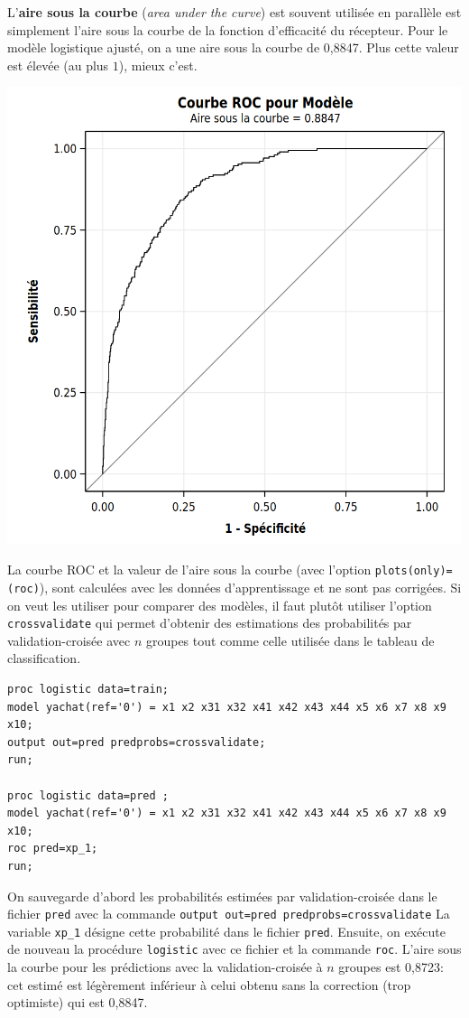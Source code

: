 \documentclass[
  11pt,
  letterpaper,
]{book}
\theoremstyle{definition}
\theoremstyle{definition}
\theoremstyle{definition}
\theoremstyle{remark}
\begin{document}
L'\textbf{aire sous la courbe} (\emph{area under the curve}) est souvent utilisée en parallèle
est simplement l'aire sous la courbe de la fonction d'efficacité du récepteur. Pour le modèle logistique ajusté, on a une aire sous la courbe de 0,8847. Plus cette valeur est élevée (au plus \(1\)), mieux c'est.

\begin{center}\includegraphics[width=0.8\linewidth]{figures/03-logistic-e11} \end{center}

La courbe ROC et la valeur de l'aire sous la courbe (avec l'option \texttt{plots(only)=(roc)}), sont calculées avec les données d'apprentissage et ne sont pas corrigées. Si on veut les utiliser pour comparer des modèles, il faut plutôt utiliser l'option \texttt{crossvalidate} qui permet d'obtenir des estimations des probabilités par validation-croisée avec \(n\) groupes tout comme celle utilisée dans le tableau de classification.

\begin{verbatim}
proc logistic data=train;
model yachat(ref='0') = x1 x2 x31 x32 x41 x42 x43 x44 x5 x6 x7 x8 x9 x10;
output out=pred predprobs=crossvalidate;
run;

proc logistic data=pred ;
model yachat(ref='0') = x1 x2 x31 x32 x41 x42 x43 x44 x5 x6 x7 x8 x9 x10;
roc pred=xp_1;
run;
\end{verbatim}

On sauvegarde d'abord les probabilités estimées par validation-croisée dans le
fichier \texttt{pred} avec la commande \texttt{output\ out=pred\ predprobs=crossvalidate}
La variable \texttt{xp\_1} désigne cette probabilité dans le fichier \texttt{pred}. Ensuite, on
exécute de nouveau la procédure \texttt{logistic} avec ce fichier et la commande \texttt{roc}.
L'aire sous la courbe pour les prédictions avec la validation-croisée à \(n\) groupes est 0,8723: cet estimé est légèrement inférieur à celui obtenu sans
la correction (trop optimiste) qui est 0,8847.
\end{document}
